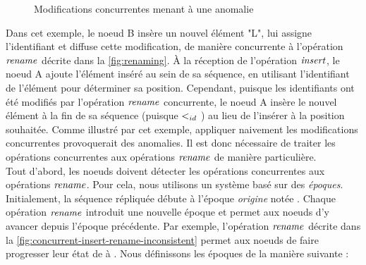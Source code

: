 \begin{figure}[!ht]
{
  }
  \caption{Modifications concurrentes menant à une anomalie}
  \label{fig:concurrent-insert-rename-inconsistent}
\end{figure}

Dans cet exemple, le noeud B insère un nouvel élément "L", lui assigne l'identifiant  et diffuse cette modification, de manière concurrente à l'opération $\mathit{rename}$ décrite dans la \autoref{fig:renaming}.
À la réception de l'opération $\mathit{insert}$, le noeud A ajoute l'élément inséré au sein de sa séquence, en utilisant l'identifiant de l'élément pour déterminer sa position.
Cependant, puisque les identifiants ont été modifiés par l'opération $\mathit{rename}$ concurrente, le noeud A insère le nouvel élément à la fin de sa séquence (puisque  $<_{id}$ ) au lieu de l'insérer à la position souhaitée.
Comme illustré par cet exemple, appliquer naivement les modifications concurrentes provoquerait des anomalies.
Il est donc nécessaire de traiter les opérations concurrentes aux opérations $\mathit{rename}$ de manière particulière.\\

Tout d'abord, les noeuds doivent détecter les opérations concurrentes aux opérations $\mathit{rename}$.
Pour cela, nous utilisons un système basé sur des \emph{époques}.
Initialement, la séquence répliquée débute à l'époque \emph{origine} notée .
Chaque opération $\mathit{rename}$ introduit une nouvelle époque et permet aux noeuds d'y avancer depuis l'époque précédente.
Par exemple, l'opération $\mathit{rename}$ décrite dans la \autoref{fig:concurrent-insert-rename-inconsistent} permet aux noeuds de faire progresser leur état de  à .
Nous définissons les époques de la manière suivante :


